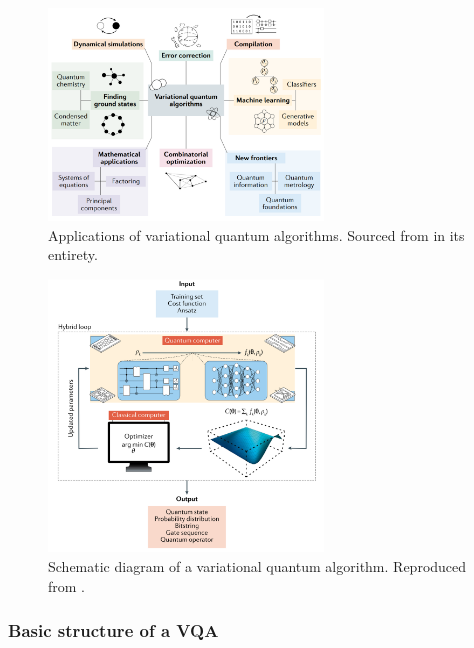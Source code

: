 \begin{figure}[H]
  \centering
  \includegraphics[width=0.65\textwidth]{Figures/Diagrams/VQAs_Applications.png}
  \caption{Applications of variational quantum algorithms. Sourced from \cite{Cerezo_2021} in its entirety.}
  \label{fig:VQAs_Applications}
\end{figure}

\begin{figure}[H]
  \centering
  \includegraphics[width=0.65\textwidth]{Figures/Diagrams/VQA_Schematic.png}
  \caption{Schematic diagram of a variational quantum algorithm. Reproduced from \cite{Cerezo_2021}.}
  \label{fig:VQA_Schematic}
\end{figure}


\subsubsection{Basic structure of a VQA}

